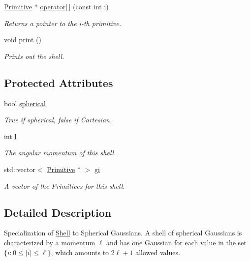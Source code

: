 \begin{DoxyCompactItemize}
\hyperlink{classJKBuilder_1_1Primitive}{Primitive} $\ast$ \hyperlink{classJKBuilder_1_1Shell_ae98a68bcb237e53c8c063aded1b34f2e}{operator\mbox{[}$\,$\mbox{]}} (const int i)
\begin{DoxyCompactList}\small\item\em Returns a pointer to the i-\/th primitive. \item\end{DoxyCompactList}\item 
void \hyperlink{classJKBuilder_1_1Shell_a388f572c62279f839ee138a9afbdeeb5}{print} ()
\begin{DoxyCompactList}\small\item\em Prints out the shell. \item\end{DoxyCompactList}\end{DoxyCompactItemize}
\subsection*{Protected Attributes}
\begin{DoxyCompactItemize}
\item 
bool \hyperlink{classJKBuilder_1_1Shell_a8a5f217a40aac0ce092effdd9b6db9f6}{spherical}
\begin{DoxyCompactList}\small\item\em True if spherical, false if Cartesian. \item\end{DoxyCompactList}\item 
int \hyperlink{classJKBuilder_1_1Shell_a89606eca6b563ec68d2da2e84657736f}{l}
\begin{DoxyCompactList}\small\item\em The angular momentum of this shell. \item\end{DoxyCompactList}\item 
std::vector$<$ \hyperlink{classJKBuilder_1_1Primitive}{Primitive} $\ast$ $>$ \hyperlink{classJKBuilder_1_1Shell_afd0049f3a997082e636f4dae72879da2}{gi}
\begin{DoxyCompactList}\small\item\em A vector of the Primitives for this shell. \item\end{DoxyCompactList}\end{DoxyCompactItemize}


\subsection{Detailed Description}
Specialization of \hyperlink{classJKBuilder_1_1Shell}{Shell} to Spherical Gaussians. A shell of spherical Gaussians is characterized by a momentum $\ell$ and has one Gaussian for each value in the set $\lbrace i:0\le |i|\le\ell\rbrace$, which amounts to $2\ell+1$ allowed values. 

